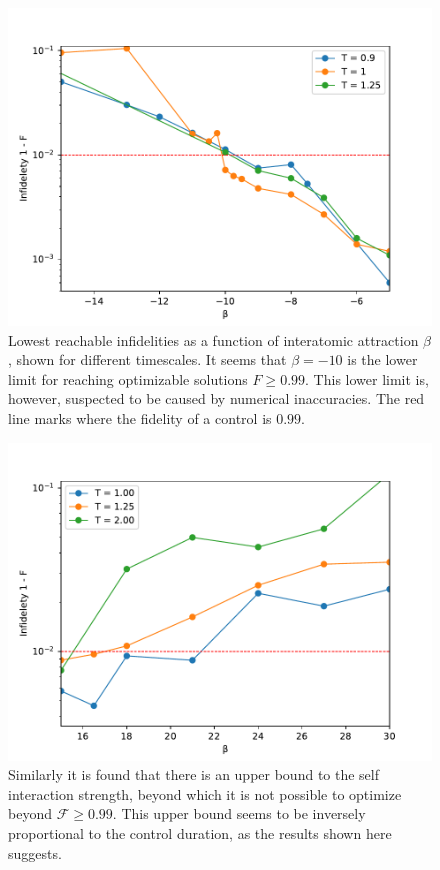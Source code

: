 \documentclass[a4paper, twocolumn]{revtex4-1}
\begin{document}
\begin{figure}
	\includegraphics[width=\columnwidth]{graphics/exploration/reachable_neg_beta.pdf}
	\caption{Lowest reachable infidelities as a function of interatomic attraction $\beta$, shown for different timescales. It seems that $\beta=-10$ is the lower limit for reaching optimizable solutions $F\geq0.99$. This lower limit is, however, suspected to be caused by numerical inaccuracies. The red line marks where the fidelity of a control is $0.99$.}
	\label{fig:reachable_neg_betas}
\end{figure}

\begin{figure}
	\includegraphics[width=\columnwidth]{graphics/exploration/Reachable_Positive_betas.pdf}
	\caption{Similarly it is found that there is an upper bound to the self interaction strength, beyond which it is not possible to optimize beyond $\mathcal{F} \geq 0.99$. This upper bound seems to be inversely proportional to the control duration, as the results shown here suggests.}
	\label{fig:reachable_pos_betas}
\end{figure}
\end{document}
